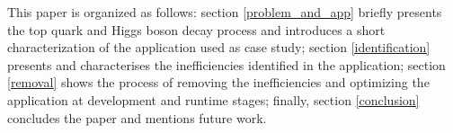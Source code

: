This paper is organized as follows: section \ref{problem_and_app} briefly presents the top quark and Higgs boson decay process and introduces a short characterization of the \tth application used as case study; section \ref{identification} presents and characterises the inefficiencies identified in the application; section \ref{removal} shows the process of removing the inefficiencies and optimizing the application at development and runtime stages; finally, section \ref{conclusion} concludes the paper and mentions future work.

